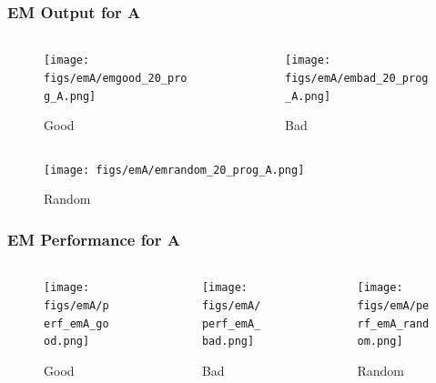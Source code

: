\documentclass[11pt]{beamer}
\begin{document}
\begin{frame}
\frametitle{EM Output for A}
\begin{columns}[onlytextwidth]
\begin{column}{.45\textwidth}
\begin{figure}
  \texttt{[image: figs/emA/emgood\_20\_prog\_A.png]}
  \caption{Good}
\end{figure}
\end{column}
\hfill
\begin{column}{.45\textwidth}
\begin{figure}
  \texttt{[image: figs/emA/embad\_20\_prog\_A.png]}
  \caption{Bad}
\end{figure}
\end{column}
\end{columns}\vfill

\begin{figure}
  \texttt{[image: figs/emA/emrandom\_20\_prog\_A.png]}
  \caption{Random}
\end{figure}
\end{frame}

\begin{frame}

\frametitle{EM Performance for A}
\begin{columns}
\begin{column}{.3\textwidth}
\begin{figure}
  \texttt{[image: figs/emA/perf\_emA\_good.png]}
  \caption{Good}
\end{figure}
\end{column}
\begin{column}{.3\textwidth}
\begin{figure}
  \texttt{[image: figs/emA/perf\_emA\_bad.png]}
  \caption{Bad}
\end{figure}
\end{column}

\begin{column}{.3\textwidth}
\begin{figure}
  \texttt{[image: figs/emA/perf\_emA\_random.png]}
  \caption{Random}
\end{figure}
\end{column}

\end{columns}
\end{frame}
\end{document}
